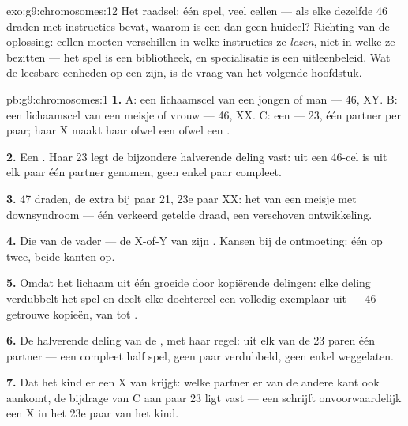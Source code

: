 \begin{solution}{exo:g9:chromosomes:12}
Het raadsel: één spel, veel  cellen --- als elke 
dezelfde 46 draden met instructies bevat, waarom is een 
dan geen huidcel? Richting van de oplossing: cellen moeten
verschillen in welke instructies ze \emph{lezen}, niet in welke
ze bezitten --- het spel is een bibliotheek, en specialisatie is
een uitleenbeleid. Wat de leesbare eenheden op een 
zijn, is de vraag van het volgende hoofdstuk.
\end{solution}

\begin{solution}{pb:g9:chromosomes:1}
\textbf{1.} A: een lichaamscel van een jongen of man --- 46, XY.
B: een lichaamscel van een meisje of vrouw --- 46, XX. C: een
 --- 23, één partner per paar; haar X maakt haar
ofwel een  ofwel een .

\textbf{2.} Een . Haar 23 legt de bijzondere
halverende deling vast: uit een 46-cel is uit elk paar één
partner genomen, geen enkel paar compleet.

\textbf{3.} 47 draden, de extra bij paar 21, 23e paar XX: het
 van een meisje met downsyndroom --- één verkeerd
getelde draad, een verschoven ontwikkeling.

\textbf{4.} Die van de vader --- de X-of-Y van zijn .
Kansen bij de ontmoeting: één op twee, beide kanten op.

\textbf{5.} Omdat het lichaam uit één  groeide door
kopiërende delingen: elke deling verdubbelt het spel en deelt
elke dochtercel een volledig exemplaar uit --- 46 getrouwe
kopieën, van  tot .

\textbf{6.} De halverende deling van de , met
haar regel: uit elk van de 23 paren één partner --- een compleet
half spel, geen paar verdubbeld, geen enkel weggelaten.

\textbf{7.} Dat het kind er een X van krijgt: welke partner er
van de andere kant ook aankomt, de bijdrage van C aan paar 23
ligt vast --- een  schrijft onvoorwaardelijk een X
in het 23e paar van het kind.


\end{solution}

